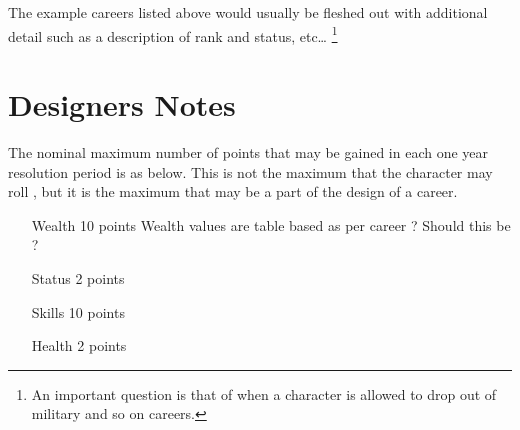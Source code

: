 The example careers listed above would usually be fleshed out with 
additional detail such as a description of rank and status, etc\dots
\footnote{An important question is that of when a character is
allowed to drop out of military and so on careers.}

\section{Designers Notes}

The nominal maximum number of points that may be gained in each one 
year resolution period is as below. This is not the maximum that the 
character may roll , but it is the maximum that may be a part of the 
design of a career.

\begin{itemize}
	\item[Wealth] 10 points
	Wealth values are table based as per career ? Should this be ?
	\item[Status] 2 points
	\item[Skills] 10 points
	\item[Health] 2 points
\end{itemize}

